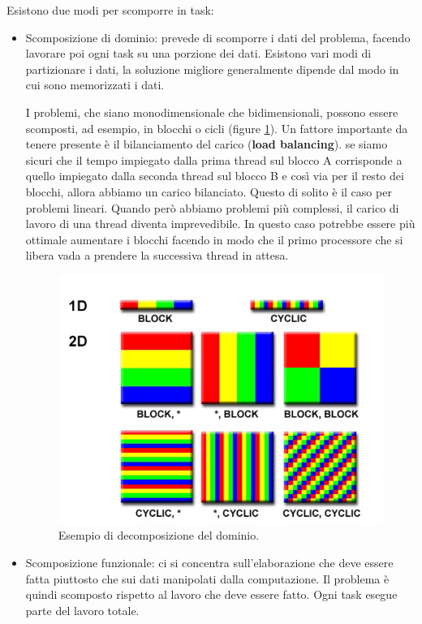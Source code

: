 Esistono due modi per scomporre in task:
\begin{itemize}
    \item Scomposizione di dominio: prevede di scomporre i dati del problema, facendo lavorare poi ogni task su una porzione dei dati. Esistono vari modi di partizionare i dati, la soluzione migliore generalmente dipende dal modo in cui sono memorizzati i dati.

    I problemi, che siano monodimensionale che bidimensionali, possono essere scomposti, ad esempio, in blocchi o cicli (figure \ref{fig:domain-decomposition}). Un fattore importante da tenere presente è il bilanciamento del carico (\textbf{load balancing}). se siamo sicuri che il tempo impiegato dalla prima thread sul blocco A corrisponde a quello impiegato dalla seconda thread sul blocco B e così via per il resto dei blocchi, allora abbiamo un carico bilanciato. Questo di solito è il caso per problemi lineari. Quando però abbiamo problemi più complessi, il carico di lavoro di una thread diventa imprevedibile. In questo caso potrebbe essere più ottimale aumentare i blocchi facendo in modo che il primo processore che si libera vada a prendere la successiva thread in attesa.
    \begin{figure}[th]
    	\centering
    	\includegraphics[width=0.7\linewidth]{img/domain-decomposition.png}
    	\caption{Esempio di decomposizione del dominio.}
    	\label{fig:domain-decomposition}
    \end{figure}

    \item Scomposizione funzionale: ci si concentra sull'elaborazione che deve essere fatta piuttosto che sui dati manipolati dalla computazione. Il problema è quindi scomposto rispetto al lavoro che deve essere fatto. Ogni task esegue parte del lavoro totale.
\end{itemize}

